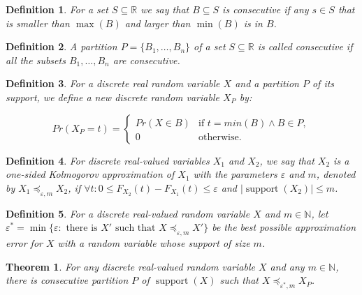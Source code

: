 \documentclass[review]{elsarticle}
\newtheorem{definition}{Definition}
\newtheorem{theorem}{Theorem}
\DeclareMathOperator{\supp}{support}
\DeclareMathOperator{\support}{support}
\begin{document}
\begin{definition}\label{consecutive} For a set $S \subseteq \mathbb{R}$ we say that
$B \subseteq S$ is \emph{consecutive} if any $s\in S$ that is smaller than $\max(B)$ and larger than $\min(B)$ is in $B$.
\end{definition}

\begin{definition}\label{part_consecutive} A partition $P=\{B_1,\dots,B_n\}$ of a set $S \subseteq \mathbb{R}$ is called 
\emph{consecutive} if all the subsets $B_1 ,\dots,B_n$ are consecutive.
\end{definition}


\begin{definition}\label{partition}
	For a discrete real random variable $X$ and a partition $P$ of its support, we define a new discrete random variable $X_P$ by:
	
	$$Pr(X_P = t) = \begin{cases} 
	Pr(X\in B) &  \text{if } t = min(B) \wedge  B \in P, \\
	0      & \text{otherwise.}
	\end{cases}$$
\end{definition}


\begin{definition}
	For discrete real-valued variables $X_1$ and $X_2$, we say that $X_2$ is a one-sided Kolmogorov approximation of $X_1$ with the parameters $\varepsilon$ and $m$, denoted by 
	$X_1 \preceq_{\varepsilon,m} X_2$, if $\forall t\colon 0 \leq   F_{X_2}(t)-F_{X_1}(t) \leq \varepsilon$ and $|\support(X_2)| \leq m$. 
\end{definition}

\begin{definition}
	For a discrete real-valued random variable $X$ and $m \in \mathbb{N}$, 
	let $\varepsilon^* = \min\{\varepsilon \colon \text{  there is $X'$ such that $X \preceq_{\varepsilon,m} X'$}\}$ be the best possible approximation error for $X$ with a random variable whose support of size $m$. 
\end{definition}



\begin{theorem}\label{approxAsPart}
For any discrete real-valued random variable $X$ and any $m \in \mathbb{N}$, there is consecutive partition $P$ of $\supp(X)$ such that $X \preceq_{\varepsilon^*,m} X_P$.
\end{theorem}
\end{document}
